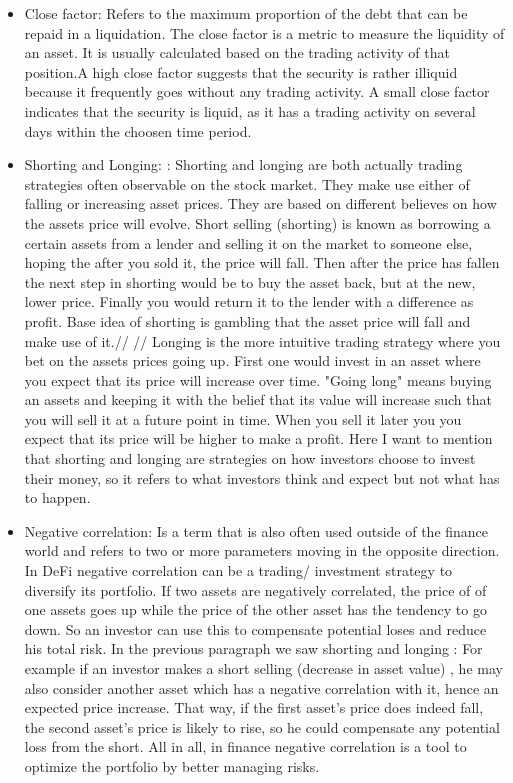 \documentclass{article}
\begin{document}
\begin{itemize}
\item {Close factor}: Refers to the maximum proportion of the debt that can be repaid in a liquidation. The close factor is a metric to measure the liquidity of an asset. It is usually calculated based on the trading activity of that position.A high close factor suggests that the security is rather illiquid because it frequently goes without any trading activity. A small close factor indicates that the security is liquid, as it has a trading activity on several days within the choosen time period.

\item {Shorting and Longing: }: Shorting and longing are both actually trading strategies often observable on the stock market. They make use either of falling or increasing asset prices. They are based on different believes on how the assets price will evolve. Short selling (shorting) is known as borrowing a certain assets from a lender and selling it on the market to someone else, hoping the after you sold it, the price will fall. Then after the price has fallen the next step in shorting would be to buy the asset back, but at the new, lower price. Finally you would return it to the lender with a difference as profit. Base idea of shorting is gambling that the asset price will fall and make use of it.//
//
Longing is the more intuitive trading strategy where you bet on the assets prices going up. First one would invest in an asset where you expect that its price will increase over time. "Going long" means buying an assets and keeping it with the belief that its value will increase such that you will sell it at a future point in time. When you sell it later you you expect that its price will be higher to make a profit. Here I want to mention that shorting and longing are strategies on how investors choose to invest their money, so it refers to what investors think and expect but not what has to happen.

\item {Negative correlation}: Is a term that is also often used outside of the finance world and refers to two or more parameters moving in the opposite direction. In DeFi negative correlation can be a trading/ investment strategy to diversify its portfolio. If two assets are negatively correlated, the price of of one assets goes up while the price of the other asset has the tendency to go down. So an investor can use this to compensate potential loses and reduce his total risk. In the previous paragraph we saw shorting and longing : For example if an investor makes a short selling (decrease in asset value) , he may also consider another asset which has a negative correlation with it, hence an expected price increase. That way, if the first asset's price does indeed fall, the second asset's price is likely to rise, so he could compensate any potential loss from the short. All in all, in finance negative correlation is a tool to optimize the portfolio by better managing risks.



\end{itemize}
\end{document}
